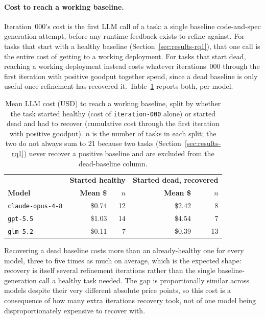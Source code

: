 \paragraph{Cost to reach a working baseline.} Iteration~000's cost is the
first LLM call of a task: a single baseline code-and-spec generation
attempt, before any runtime feedback exists to refine against. For tasks
that start with a healthy baseline (Section~\ref{sec:results-rq1}), that
one call is the entire cost of getting to a working deployment.
For tasks that start dead, reaching a working deployment instead costs
whatever iterations~000 through the first iteration with positive
goodput together spend, since a dead baseline is only useful once
refinement has recovered it. Table~\ref{tab:appendix-cost-baseline}
reports both, per model.

\begin{table}[htbp]
  \centering
  \caption{Mean LLM cost (USD) to reach a working baseline, split by
    whether the task started healthy (cost of \texttt{iteration-000}
    alone) or started dead and had to recover (cumulative cost through
    the first iteration with positive goodput). $n$ is the number of
    tasks in each split; the two do not always sum to 21 because two
    tasks (Section~\ref{sec:results-rq1}) never recover a positive
    baseline and are excluded from the dead-baseline column.}
  \label{tab:appendix-cost-baseline}
  \small
  \begin{tabular}{@{}lrrrr@{}}
    \toprule
    & \multicolumn{2}{c}{\textbf{Started healthy}} & \multicolumn{2}{c}{\textbf{Started dead, recovered}} \\
    \textbf{Model} & \textbf{Mean \$} & \textbf{$n$} & \textbf{Mean \$} & \textbf{$n$} \\
    \midrule
    \texttt{claude-opus-4-8} & \$0.74 & 12 & \$2.42 & 8 \\
    \texttt{gpt-5.5}         & \$1.03 & 14 & \$4.54 & 7 \\
    \texttt{glm-5.2}         & \$0.11 & 7  & \$0.39 & 13 \\
    \bottomrule
  \end{tabular}
\end{table}

Recovering a dead baseline costs more than an already-healthy one for
every model, three to five times as much on average, which is the
expected shape: recovery is itself several refinement iterations rather
than the single baseline-generation call a healthy task needed. The gap
is proportionally similar across models despite their very different
absolute price points, so this cost is a consequence of how many extra
iterations recovery took, not of one model being disproportionately
expensive to recover with.

